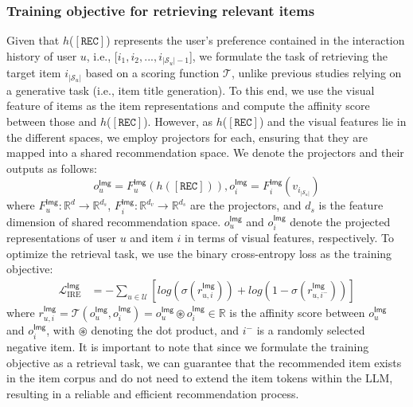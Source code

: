 \documentclass[sigconf]{acmart}
\newcommand{\rectoken}{$\left[ \texttt{REC} \right]$}
\begin{document}
\subsubsection{\textbf{Training objective for retrieving relevant items}} Given that $h$(\rectoken{}) represents the user's preference contained in the interaction history of user $u$, i.e., [$i_1, i_2,...,i_{|\mathcal{S}_u|-1}$], we formulate the task of retrieving the target item $i_{|\mathcal{S}_u|}$ based on a scoring function $\mathcal{T}$, unlike previous studies relying on a generative task (i.e., item title generation). To this end, we use the visual feature of items as the item representations and compute the affinity score between those and $h$(\rectoken{}).
However, as $h$(\rectoken{}) and the visual features lie in the different spaces, we employ projectors for each, ensuring that they are mapped into a shared recommendation space. We denote the projectors and their outputs as follows:
\begin{equation}
    o_u^{\textsf{Img}}=F^{\textsf{Img}}_u(h(\left[ \texttt{REC} \right])), o_i^{\textsf{Img}}=F^{\textsf{Img}}_i(v_{i_{|\mathcal{S}_u|}})
    \label{eqn:4}
\end{equation}
where $F^{\textsf{Img}}_u:\mathbb{R}^d \rightarrow \mathbb{R}^{d_{s}}$, $F^{\textsf{Img}}_i:\mathbb{R}^{d_{v}} \rightarrow \mathbb{R}^{d_{s}}$ are the projectors, and $d_s$ is the feature dimension of shared recommendation space. $o_u^{\textsf{Img}}$ and $o_i^{\textsf{Img}}$ denote the projected representations of user $u$ and item $i$ in terms of visual features, respectively. 
To optimize the retrieval task,
we use the binary cross-entropy loss
as the training objective:
\begin{equation}
\begin{split}
    \mathcal{L}_{\text{IRE}}^{\textsf{Img}} &= -\sum_{u \in \mathcal{U}}\left[ log(\sigma(r_{u,i}^{\textsf{Img}}))+log(1-\sigma(r_{u,i^-}^{\textsf{Img}})) \right] 
\label{eqn:5}
\end{split}
\end{equation}
where $r_{u,i}^{\textsf{Img}} =\mathcal{T}(o_u^{\textsf{Img}},o_i^{\textsf{Img}}) = o_u^{\textsf{Img}} \circledast o_i^{\textsf{Img}} \in \mathbb{R}$ is the affinity score between $o_u^{\textsf{Img}}$ and $o_i^{\textsf{Img}}$, with $\circledast$ denoting the dot product, and $i^-$ is a randomly selected negative item. It is important to note that since we formulate the training objective as a retrieval task, we can guarantee that the recommended item exists in the item corpus and do not need to extend the item tokens within the LLM, resulting in a reliable and efficient recommendation process.
\end{document}
